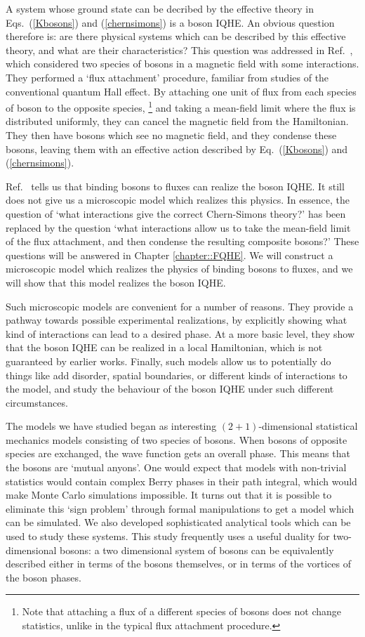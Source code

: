 A system whose ground state can be decribed by the effective theory in Eqs.~(\ref{Kbosons}) and (\ref{chernsimons}) is a boson IQHE. An obvious question therefore is: are there physical systems which can be described by this effective theory, and what are their characteristics? This question was addressed in Ref.~\cite{SenthilLevin2012}, which considered two species of bosons in a magnetic field with some interactions. They performed a `flux attachment' procedure, familiar from studies of the conventional quantum Hall effect. By attaching one unit of flux from each species of boson to the opposite species,
\footnote{Note that attaching a flux of a different species of bosons does not change statistics, unlike in the typical flux attachment procedure.} 
and taking a mean-field limit where the flux is distributed uniformly, they can cancel the magnetic field from the Hamiltonian. They then have bosons which see no magnetic field, and they condense these bosons, leaving them with an effective action described by Eq.~(\ref{Kbosons}) and (\ref{chernsimons}). 

Ref.~\cite{SenthilLevin2012} tells us that binding bosons to fluxes can realize the boson IQHE. It still does not give us a microscopic model which realizes this physics. In essence, the question of `what interactions give the correct Chern-Simons theory?' has been replaced by the question `what interactions allow us to take the mean-field limit of the flux attachment, and then condense the resulting composite bosons?' These questions will be answered in Chapter \ref{chapter::FQHE}. We will construct a microscopic model which realizes the physics of binding bosons to fluxes, and we will show that this model realizes the boson IQHE.

Such microscopic models are convenient for a number of reasons. They provide a pathway towards possible experimental realizations, by explicitly showing what kind of interactions can lead to a desired phase. At a more basic level, they show that the boson IQHE can be realized in a local Hamiltonian, which is not guaranteed by earlier works. Finally, such models allow us to potentially do things like add disorder, spatial boundaries, or different kinds of interactions to the model, and study the behaviour of the boson IQHE under such different circumstances. 

The models we have studied began as interesting $(2+1)$-dimensional statistical mechanics models consisting of two species of bosons. When bosons of opposite species are exchanged, the wave function gets an overall phase. This means that the bosons are `mutual anyons'. One would expect that models with non-trivial statistics would contain complex Berry phases in their path integral, which would make Monte Carlo simulations impossible. It turns out that it is possible to eliminate this `sign problem' through formal manipulations to get a model which can be simulated. We also developed sophisticated analytical tools which can be used to study these systems. This study frequently uses a useful duality for two-dimensional bosons: a two dimensional system of bosons can be equivalently described either in terms of the bosons themselves, or in terms of the vortices of the boson phases.

